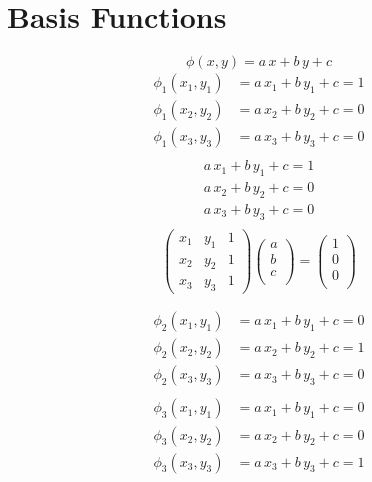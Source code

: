 \documentclass[11pt]{amsart}
\begin{document}
\section{Basis Functions}
\[
\phi(x,y) = a\, x + b\, y + c
\]
\begin{align*}
\phi_1(x_1,y_1)  & =  a\, x_1 + b\, y_1 + c  =  1 \\
\phi_1(x_2,y_2)  & =  a\, x_2 + b\, y_2 + c  =  0 \\
\phi_1(x_3,y_3)  & =  a\, x_3 + b\, y_3 + c  =  0 \\
\end{align*}
\begin{align*}
  a\, x_1 + b\, y_1 + c  =  1 \\
  a\, x_2 + b\, y_2 + c  =  0 \\
  a\, x_3 + b\, y_3 + c  =  0 \\
\end{align*}
\[
\left(
\begin{array}{ccc}
x_1 & y_1 & 1 \\
x_2 & y_2 & 1 \\
x_3 & y_3 & 1 
\end{array}
\right)
\left(
\begin{array}{c}
a\\
b\\
c\\
\end{array}
\right) =
\left(
\begin{array}{c}
1\\
0\\
0\\
\end{array}
\right)
\]


\begin{align*}
\phi_2(x_1,y_1)  & =  a\, x_1 + b\, y_1 + c  =  0 \\
\phi_2(x_2,y_2)  & =  a\, x_2 + b\, y_2 + c  =  1 \\
\phi_2(x_3,y_3)  & =  a\, x_3 + b\, y_3 + c  =  0 \\
\end{align*}
\begin{align*}
\phi_3(x_1,y_1)  & =  a\, x_1 + b\, y_1 + c  =  0 \\
\phi_3(x_2,y_2)  & =  a\, x_2 + b\, y_2 + c  =  0 \\
\phi_3(x_3,y_3)  & =  a\, x_3 + b\, y_3 + c  =  1 \\
\end{align*}
\end{document}
